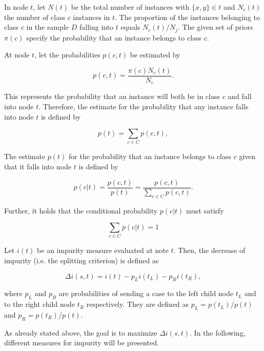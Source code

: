 In node \(t\), let \(N(t)\) be the total number of instances with \( \{x,y\} \in t \) 
and \( N_{c}(t) \) the number of class \(c\) instances in \(t\). 
The proportion of the instances belonging to class \(c\) in the sample \(D\) falling into \(t\) 
equals \( N_{c}(t) / N_{j} \).
The given set of priors \( \pi(c) \) specify the probability that an instance belongs to class \(c\).

At node \(t\), let the probabilities \(p(c,t)\) be estimated by 

\begin{equation}
    p(c,t) = \frac{ \pi(c)N_{c}(t) }{ N_{c} }.
\end{equation}

This represents the probability that an instance will both be in class \(c\) and fall into node \(t\).
Therefore, the estimate for the probability that any instance falls into node \(t\) is defined by

\begin{equation}
    p(t) = \sum_{c \in C} p(c,t),
\end{equation}

The estimate \( p(t) \) for the probability that an instance belongs to class \(c\) given that it falls into node \(t\) is defined by

\begin{equation}
    p(c|t) = \frac{ p(c,t)}{ p(t) } = \frac{ p(c,t) }{ \sum_{c \in C} p(c,t) }.
\end{equation}

Further, it holds that the conditional probability \(p(c|t)\) must satisfy

\begin{equation}
    \sum_{c \in C} p(c|t)  = 1
\end{equation}

Let \(i(t)\) be an impurity measure evaluated at note \(t\). 
Then, the decrease of impurity (i.e. the splitting criterion) is defined as

\begin{equation}
    \Delta i(s,t) = i(t) - p_{L} i(t_{L}) - p_{R} i(t_{R}),
\end{equation}

where \(p_{L}\) and \(p_{R}\) are probabilities of sending a case to the left child node \(t_{L}\) and to the
right child node \(t_{R}\) respectively. 
They are defined as \( p_{L} = p(t_{L}) / p(t) \) and \( p_{R} = p(t_{R}) / p(t) \).

As already stated above, the goal is to maximize \(\Delta i(s,t)\).
In the following, different measures for impurity will be presented.

